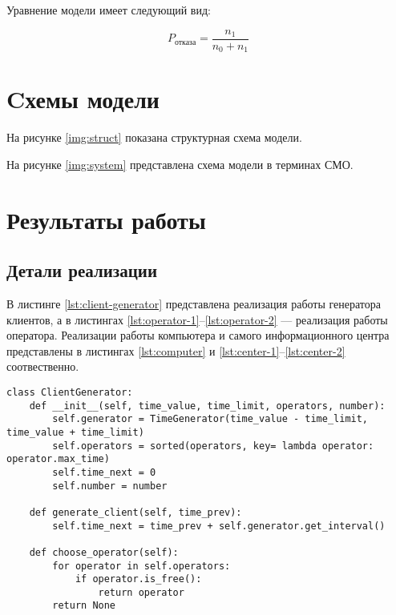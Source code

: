 Уравнение модели имеет следующий вид:

\begin{equation}
    P_{\text{отказа}} = \frac{n_{1}}{n_{0} + n_{1}}
\end{equation}

\section*{Cхемы модели}

На рисунке \ref{img:struct} показана структурная схема модели.


На рисунке \ref{img:system} представлена схема модели в терминах СМО.


\section*{Результаты работы}

\subsection*{Детали реализации}

В листинге \ref{lst:client-generator} представлена реализация работы генератора клиентов, а в листингах \ref{lst:operator-1}--\ref{lst:operator-2} --- реализация работы оператора.
Реализации работы компьютера и самого информационного центра представлены в листингах \ref{lst:computer} и \ref{lst:center-1}--\ref{lst:center-2} соотвественно.
\clearpage

\begin{center}
\captionsetup{justification=raggedright,singlelinecheck=off}
\begin{lstlisting}[label=lst:client-generator,caption=Реализация работы генератора клиентов]
class ClientGenerator:
    def __init__(self, time_value, time_limit, operators, number):
        self.generator = TimeGenerator(time_value - time_limit, time_value + time_limit)
        self.operators = sorted(operators, key= lambda operator: operator.max_time)
        self.time_next = 0
        self.number = number

    def generate_client(self, time_prev):
        self.time_next = time_prev + self.generator.get_interval()

    def choose_operator(self):
        for operator in self.operators:
            if operator.is_free():
                return operator
        return None
\end{lstlisting}
\end{center}

